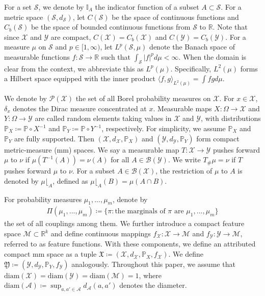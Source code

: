 \documentclass{article}
\theoremstyle{plain}
\theoremstyle{definition}
\theoremstyle{remark}
\begin{document}
For a set $\mathcal{S}$, we denote by $\mathbb{I}_A$ the indicator function of a subset $A \subset \mathcal{S}$. For a metric space $(\mathcal{S}, d_{\mathcal{S}})$, let $C(\mathcal{S})$ be the space of continuous functions and $C_b(\mathcal{S})$ be the space of bounded continuous functions from $\mathcal{S}$ to $\mathbb{R}$. Note that since $\mathcal{X}$ and $\mathcal{Y}$ are compact, $C(\mathcal{X}) = C_b(\mathcal{X})$ and $C(\mathcal{Y}) = C_b(\mathcal{Y})$.
For a measure $\mu$ on $\mathcal{S}$ and $p \in [1, \infty)$, let $L^p(\mathcal{S}, \mu)$ denote the Banach space of measurable functions $f: \mathcal{S} \to \mathbb{R}$ such that $\int_{\mathcal{S}} |f|^p d\mu < \infty$. When the domain is clear from the context, we abbreviate this as $L^p(\mu)$. Specifically, $L^2(\mu)$ forms a Hilbert space equipped with the inner product $\langle f, g \rangle_{L^2(\mu)} = \int f g d\mu$.

We denote by $\mathcal{P}(\mathcal{X})$ the set of all Borel probability measures on $\mathcal{X}$. For $x \in \mathcal{X}$, $\delta_x$ denotes the Dirac measure concentrated at $x$.
Measurable maps $X:\Omega\to \mathcal{X}$ and $Y:\Omega\to \mathcal{Y}$ are called random elements taking values in $\mathcal{X}$ and $\mathcal{Y}$, with distributions $\mathbb{P}_X\coloneqq\mathbb{P}\circ X^{-1}$ and $\mathbb{P}_Y\coloneqq\mathbb{P}\circ Y^{-1}$, respectively. For simplicity, we assume $\mathbb{P}_X$ and $\mathbb{P}_Y$ are fully supported. Then $(\mathcal{X},d_{\mathcal{X}},\mathbb{P}_X)$ and $(\mathcal{Y},d_{\mathcal{Y}},\mathbb{P}_Y)$ form compact metric-measure (mm) spaces.
We say a measurable map $T: \mathcal{X} \to \mathcal{Y}$ pushes forward $\mu$ to $\nu$ if $\mu(T^{-1}(A)) = \nu(A)$ for all $A \in \mathcal{B}(\mathcal{Y})$. We write $T_{\#}\mu = \nu$ if $T$ pushes forward $\mu$ to $\nu$.
For a subset $A \in \mathcal{B}(\mathcal{X})$, the restriction of $\mu$ to $A$ is denoted by $\mu\lfloor_A$, defined as $\mu\lfloor_A(B) = \mu(A \cap B)$.

For probability measures $\mu_1,...,\mu_m$, denote by
\begin{align*}
	\Pi(\mu_1,...,\mu_m) \coloneqq \{\pi : \text{the marginals of $\pi$ are $\mu_1,...,\mu_m$}\}
\end{align*}
the set of all couplings among them.
We further introduce a compact feature space $\mathcal{M}\subset\mathbb{R}^k$ and define continuous mappings $f_{\mathcal{X}}:\mathcal{X}\to \mathcal{M}$ and $f_{\mathcal{Y}}:\mathcal{Y}\to \mathcal{M}$, referred to as feature functions. With these components, we define an attributed compact mm space as a tuple $\mathfrak{X} \coloneqq (\mathcal{X}, d_{\mathcal{X}}, \mathbb{P}_X, f_{\mathcal{X}})$. We define $\mathfrak{Y} \coloneqq (\mathcal{Y}, d_{\mathcal{Y}}, \mathbb{P}_Y, f_{\mathcal{Y}})$ analogously. Throughout this paper, we assume that $\mathrm{diam}(\mathcal{X}) = \mathrm{diam}(\mathcal{Y}) = \mathrm{diam}(\mathcal{M}) = 1$, where $\mathrm{diam}(\mathcal{A}) \coloneqq \sup_{a,a'\in \mathcal{A}} d_{\mathcal{A}}(a,a')$ denotes the diameter.
\end{document}
